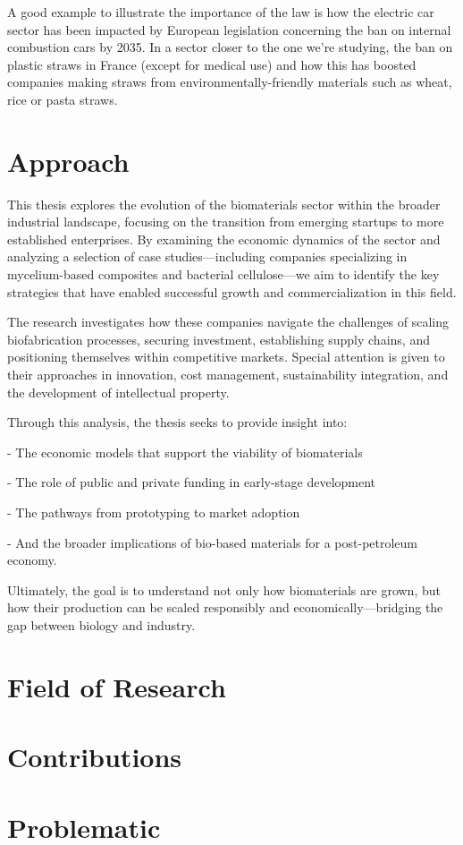 A good example to illustrate the importance of the law is how the electric car sector has been impacted by European legislation concerning the ban on internal combustion cars by 2035. 
In a sector closer to the one we're studying, the ban on plastic straws in France (except for medical use) and how this has boosted companies making straws from environmentally-friendly materials such as wheat, rice or pasta straws.

\section{Approach}

This thesis explores the evolution of the biomaterials sector within the broader industrial landscape, focusing on the transition from emerging startups to more established enterprises. By examining the economic dynamics of the sector and analyzing a selection of case studies—including companies specializing in mycelium-based composites and bacterial cellulose—we aim to identify the key strategies that have enabled successful growth and commercialization in this field.

The research investigates how these companies navigate the challenges of scaling biofabrication processes, securing investment, establishing supply chains, and positioning themselves within competitive markets. Special attention is given to their approaches in innovation, cost management, sustainability integration, and the development of intellectual property.

Through this analysis, the thesis seeks to provide insight into:

- The economic models that support the viability of biomaterials

- The role of public and private funding in early-stage development

- The pathways from prototyping to market adoption

- And the broader implications of bio-based materials for a post-petroleum economy.

Ultimately, the goal is to understand not only how biomaterials are grown, but how their production can be scaled responsibly and economically—bridging the gap between biology and industry.

\section{Field of Research}



\section{Contributions}




\section{Problematic}